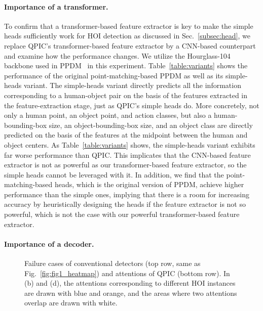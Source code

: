 \documentclass[final]{cvpr}
\begin{document}
\paragraph{Importance of a transformer.}
To confirm that a transformer-based feature extractor is key to make the simple heads sufficiently work for HOI detection as discussed in Sec.~\ref{subsec:head}, we replace QPIC's transformer-based feature extractor by a CNN-based counterpart and examine how the performance changes.
We utilize the Hourglass-104 backbone used in PPDM~\cite{liao_cvpr2020} in this experiment.
Table~\ref{table:variants} shows the performance of the original point-matching-based PPDM as well as its simple-heads variant.
The simple-heads variant directly predicts all the information corresponding to a human-object pair on the basis of the features extracted in the feature-extraction stage, just as QPIC's simple heads do.
More concretely, not only a human point, an object point, and action classes, but also a human-bounding-box size, an object-bounding-box size, and an object class are directly predicted on the basis of the features at the midpoint between the human and object centers.
As Table~\ref{table:variants} shows, the simple-heads variant exhibits far worse performance than QPIC.
This implicates that the CNN-based feature extractor is not as powerful as our transformer-based feature extractor, so the simple heads cannot be leveraged with it.
In addition, we find that the point-matching-based heads, which is the original version of PPDM, achieve higher performance than the simple ones, implying that there is a room for increasing accuracy by heuristically designing the heads if the feature extractor is not so powerful, which is not the case with our powerful transformer-based feature extractor.

\vspace{-2.0ex}

\paragraph{Importance of a decoder.}
\begin{figure*}[t]
\centering
{}
\caption{Failure cases of conventional detectors (top row, same as Fig.~\ref{fig:fig1_heatmap}) and attentions of QPIC (bottom row). In (b) and (d), the attentions corresponding to different HOI instances are drawn with blue and orange, and the areas where two attentions overlap are drawn with white.}
\label{fig:fig4_qualitative}
\vspace{-2.0ex}
\end{figure*}
\end{document}

